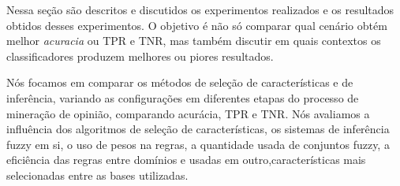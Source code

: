 \documentclass[template.tex]{subfiles}
\begin{document}

Nessa seção são descritos e discutidos os experimentos realizados e os resultados obtidos desses experimentos. O objetivo é não só comparar qual cenário obtém melhor \textit{acuracia} ou TPR e TNR, mas também discutir em quais contextos os classificadores produzem melhores ou piores resultados.



Nós focamos em comparar os métodos de seleção de características e de inferência, variando as configurações em diferentes etapas do processo de mineração de opinião, comparando acurácia, TPR e TNR. Nós avaliamos a influência dos algoritmos de seleção de características, os sistemas de inferência fuzzy em si, o uso de pesos na regras, a quantidade usada de conjuntos fuzzy, a eficiência das regras entre domínios e usadas em outro,características mais selecionadas entre as bases utilizadas. 


\end{document}
